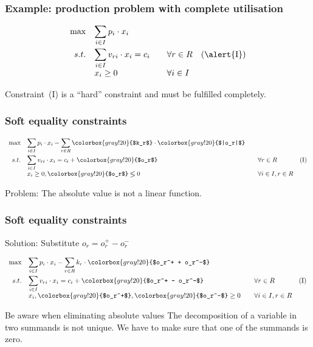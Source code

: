 \begin{frame}
 \frametitle{Example: production problem with complete utilisation}
 \begin{equation*}
  \begin{array}{rllr}
    \max & \displaystyle\sum_{i\in I} p_i\cdot x_i & & \\[3ex]
    s.t. & \displaystyle\sum_{i\in I} v_{ri}\cdot x_i = c_i & \quad\forall r\in R & \mathrm{(\alert{I})}\\
	  & x_i \geq 0 & \quad\forall i\in I & \\
  \end{array}
 \end{equation*}
 
 Constraint~\textrm{(\alert{I})} is a ``hard'' constraint and must be fulfilled completely.
\end{frame}

\begin{frame}
 \frametitle{Soft equality constraints}
  \begin{equation*}
    \begin{array}{rllr}
      \max & \displaystyle\sum_{i\in I} p_i\cdot x_i - \sum_{r\in R} \colorbox{gray!20}{$k_r$} \cdot \colorbox{gray!20}{$|o_r|$} & & \\[3ex]
      s.t. & \displaystyle\sum_{i\in I} v_{ri}\cdot x_i = c_i + \colorbox{gray!20}{$o_r$} & \quad\forall r\in R & \mathrm{(I)}\\
	    & x_i \geq 0, \colorbox{gray!20}{$o_r$} \lessgtr0 & \quad\forall i\in I, r\in R & \\
    \end{array}
  \end{equation*}
 
 Problem: The absolute value is not a linear function.
\end{frame}

\begin{frame}
 \frametitle{Soft equality constraints}
  Solution: Substitute $o_r = o_r^+ - o_r^-$
  
  \begin{equation*}
    \begin{array}{rllr}
      \max & \displaystyle\sum_{i\in I} p_i\cdot x_i - \sum_{r\in R} k_r \cdot \colorbox{gray!20}{$o_r^+ + o_r^-$} & & \\[3ex]
      s.t. & \displaystyle\sum_{i\in I} v_{ri}\cdot x_i = c_i + \colorbox{gray!20}{$o_r^+ - o_r^-$} & \quad\forall r\in R & \mathrm{(I)}\\
	    & x_i, \colorbox{gray!20}{$o_r^+$}, \colorbox{gray!20}{$o_r^-$} \geq 0 & \quad\forall i\in I, r\in R & \\
    \end{array}
  \end{equation*}
  
  \begin{alertblock}{Be aware when eliminating absolute values}
   The decomposition of a variable in two summands is not unique. We have to make sure that one of the summands is zero.
  \end{alertblock}
\end{frame}

